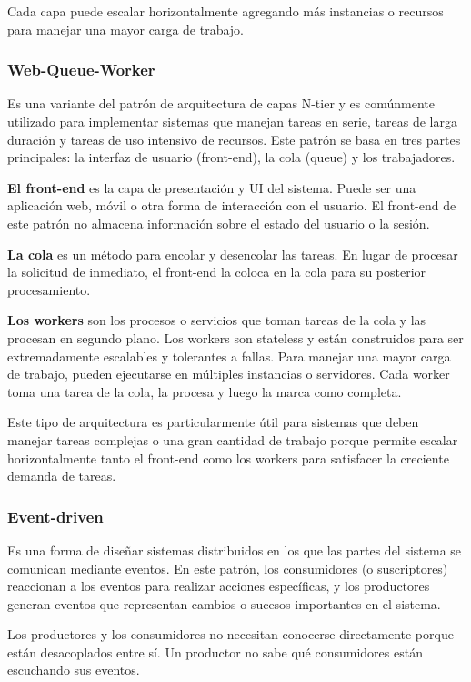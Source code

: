 \documentclass{article}
\begin{document}
		Cada capa puede escalar horizontalmente agregando más instancias o recursos para manejar una mayor carga de trabajo.
		
		
		\subsubsection{Web-Queue-Worker}
		Es una variante del patrón de arquitectura de capas N-tier y es comúnmente utilizado para implementar sistemas que manejan tareas en serie, tareas de larga duración y tareas de uso intensivo de recursos. Este patrón se basa en tres partes principales: la interfaz de usuario (front-end), la cola (queue) y los trabajadores.
		
		\textbf{El front-end} es la capa de presentación y UI del sistema. Puede ser una aplicación web, móvil o otra forma de interacción con el usuario. El front-end de este patrón no almacena información sobre el estado del usuario o la sesión.
		
		\textbf{La cola} es un método para encolar y desencolar las tareas. En lugar de procesar la solicitud de inmediato, el front-end la coloca en la cola para su posterior procesamiento. 
		
		\textbf{Los workers} son los procesos o servicios que toman tareas de la cola y las procesan en segundo plano. Los workers son stateless y están construidos para ser extremadamente escalables y tolerantes a fallas. Para manejar una mayor carga de trabajo, pueden ejecutarse en múltiples instancias o servidores. Cada worker toma una tarea de la cola, la procesa y luego la marca como completa.
		
		Este tipo de arquitectura es particularmente útil para sistemas que deben manejar tareas complejas o una gran cantidad de trabajo porque permite escalar horizontalmente tanto el front-end como los workers para satisfacer la creciente demanda de tareas.
		
		
		\subsubsection{Event-driven}
		Es una forma de diseñar sistemas distribuidos en los que las partes del sistema se comunican mediante eventos. En este patrón, los consumidores (o suscriptores) reaccionan a los eventos para realizar acciones específicas, y los productores generan eventos que representan cambios o sucesos importantes en el sistema.
		
		Los productores y los consumidores no necesitan conocerse directamente porque están desacoplados entre sí. Un productor no sabe qué consumidores están escuchando sus eventos.
		
\end{document}
